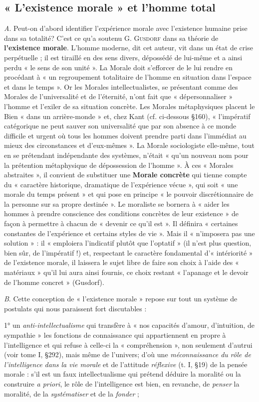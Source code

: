 \subsection{« L'existence morale » et l’homme total}%
{\it A}. Peut-on
d’abord identifier l'expérience morale avec l'existence humaine prise
dans sa totalité? C’est ce qu’a soutenu G. \textsc{Gusdorf} dans sa théorie
de {\bf l'existence morale}. L'homme moderne, dit cet auteur, vit dans un
état de crise perpétuelle ; il est tiraillé en des sens divers, dépossédé de
lui-même et a ainsi perdu « le sens de son unité ». La Morale doit
s’efforcer de le lui rendre en procédant à « un regroupement totalitaire
de l’homme en situation dans l’espace et dans le temps ». Or les
Morales intellectualistes, se présentant comme des Morales de l’universalité
et de l'éternité, n’ont fait que « dépersonnaliser » l’homme
et l’exiler de sa situation concrète. Les Morales métaphysiques placent
le Bien « dans un arrière-monde » et, chez Kant (cf. ci-dessous \S 160),
« l'impératif catégorique ne peut sauver son universalité que par
son absence à ce monde difficile et urgent où tous les hommes doivent
prendre parti dans l’immédiat au mieux des circonstances et d’eux-mêmes ».
La Morale sociologiste elle-même, tout en se prétendant
indépendante des systèmes, n’était « qu’un nouveau nom pour la
prétention métaphysique de dépossession de l’homme ». À ces « Morales
abstraites », il convient de substituer une {\bf Morale concrète} qui tienne
compte du « caractère historique, dramatique de l'expérience vécue »,
qui soit « une morale du temps présent » et qui pose en principe
« le pouvoir discrétionnaire de la personne sur sa propre destinée ».
Le moraliste se bornera à « aider les hommes à prendre conscience
des conditions concrètes de leur existence » de façon à permettre
à chacun de « devenir ce qu'il est ». Il définira « certaines constantes
de l’expérience et certains styles de vie ». Mais il « n’imposera pas
une solution » : il « emploiera l'indicatif plutôt que l’optatif » (il
n’est plus question, bien sûr, de l’impératif !) et, respectant le caractère
fondamental d’« intériorité » de l’existence morale, il laissera
le sujet libre de faire son choix à l’aide des « matériaux » qu’il lui aura
ainsi fournis, ce choix restant « l’apanage et le devoir de l’homme
concret » (Gusdorf).

{\it B}. Cette conception de « l’existence morale » repose sur tout un
système de postulats qui nous paraissent fort discutables :

1° un {\it anti-intellectualisme} qui transfère à « nos capacités d’amour,
d’intuition, de sympathie » les fonctions de connaissance qui appartiennent
en propre à l'intelligence et qui refuse à celle-ci la « compréhension »,
non seulement d'autrui (voir tome I, \S 292), mais
même de l’univers; d’où une {\it méconnaissance du rôle de l’intelligence
dans la vie morale} et de l'attitude {\it réflexive} (t. I, \S 19) de la
pensée morale : s’il est un faux intellectualisme qui prétend déduire
la moralité ou la construire {\it a priori}, le rôle de l’intelligence est bien,
en revanche, de {\it penser} la moralité, de la {\it systématiser} et de la {\it fonder} ;

